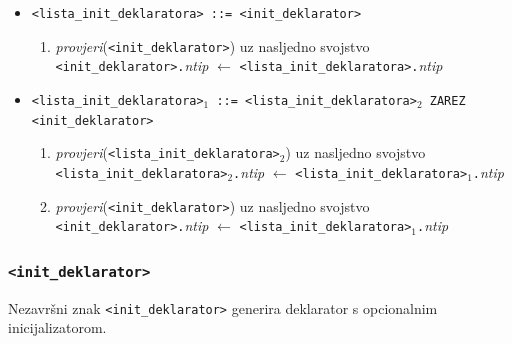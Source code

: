\documentclass[times, 12pt, utf8]{book}
\begin{document}
\begin{itemize}

\item
\verb|<lista_init_deklaratora> ::= <init_deklarator>|
\begin{enumerate}
\item
\emph{provjeri}(\verb|<init_deklarator>|) uz nasljedno svojstvo\\
\verb|<init_deklarator>.|\emph{ntip} \(\leftarrow\) \verb|<lista_init_deklaratora>.|\emph{ntip}
\end{enumerate}

\item
\verb|<lista_init_deklaratora>|\(_1\)\verb| ::= <lista_init_deklaratora>|\(_2\)\verb| ZAREZ <init_deklarator>|
\begin{enumerate}
\item
\emph{provjeri}(\verb|<lista_init_deklaratora>|\(_2\)) uz nasljedno svojstvo\\
\verb|<lista_init_deklaratora>|\(_2\)\verb|.|\emph{ntip} \(\leftarrow\) \verb|<lista_init_deklaratora>|\(_1\)\verb|.|\emph{ntip}
\item
\emph{provjeri}(\verb|<init_deklarator>|) uz nasljedno svojstvo\\
\verb|<init_deklarator>.|\emph{ntip} \(\leftarrow\) \verb|<lista_init_deklaratora>|\(_1\)\verb|.|\emph{ntip}
\end{enumerate}

\end{itemize}


\subsubsection{\texttt{<init\_deklarator>}}

Nezavršni znak \verb|<init_deklarator>| generira deklarator s opcionalnim inicijalizatorom.
\end{document}

